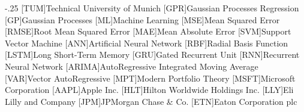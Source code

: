 \documentclass[headsepline,footsepline,footinclude=false,oneside,fontsize=11pt,paper=a4,listof=totoc,bibliography=totoc]{scrbook} %
\begin{document}


\frontmatter{}





\tableofcontents{}

\mainmatter{}










\appendix{}


\begin{acronym}
	\itemsep-.25\baselineskip
	[TUM]{Technical University of Munich}
	[GPR]{Gaussian Processes Regression}
	[GP]{Gaussian Processes}
	[ML]{Machine Learning}
	[MSE]{Mean Squared Error}
	[RMSE]{Root Mean Squared Error}
	[MAE]{Mean Absolute Error}
	[SVM]{Support Vector Machine}
	[ANN]{Artificial Neural Network}
	[RBF]{Radial Basis Function}
	[LSTM]{Long Short-Term Memory}
	[GRU]{Gated Recurrent Unit}
	[RNN]{Recurrent Neural Network}
	[ARIMA]{AutoRegressive Integrated Moving Average}
	[VAR]{Vector AutoRegressive}
	[MPT]{Modern Portfolio Theory}
	[MSFT]{Microsoft Corporation}
	[AAPL]{Apple Inc.}
	[HLT]{Hilton Worldwide Holdings Inc.}
	[LLY]{Eli Lilly and Company}
	[JPM]{JPMorgan Chase \& Co.}
	[ETN]{Eaton Corporation plc}

\end{acronym}


\listoffigures{}
\listoftables{}
\printbibliography{}
\end{document}
